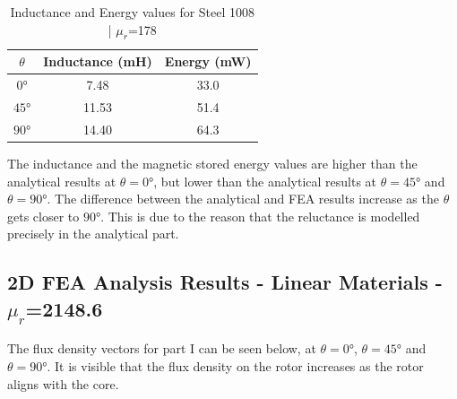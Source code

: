 \documentclass[a4paper, 11pt]{article}
\begin{document}
\begin{table}[htbp]
	\begin{center}
		\begin{tabular}{|c|c|c}
			$\theta$ & Inductance (mH) & Energy (mW)\\
			\hline
			$\ang{0}$ & 7.48 & 33.0\\
			$\ang{45}$ & 11.53 & 51.4\\
			$\ang{90}$ & 14.40 & 64.3\\
		\end{tabular}
	\end{center}
	\caption{Inductance and Energy values for Steel 1008 | $\mu_r$=178}
\end{table}

The inductance and the magnetic stored energy values are higher than the analytical results at $\theta=\ang{0}$, but lower than the analytical results at $\theta=\ang{45}$ and $\theta=\ang{90}$. The difference between the analytical and FEA results increase as the $\theta$ gets closer to $\ang{90}$. This is due to the reason that the reluctance is modelled precisely in the analytical part. 

\subsection{2D FEA Analysis Results - Linear Materials - $\mu_r$=2148.6}
The flux density vectors for part I can be seen below, at $\theta=\ang{0}$, $\theta=\ang{45}$ and $\theta=\ang{90}$. It is visible that the flux density on the rotor increases as the rotor aligns with the core. 
\end{document}
